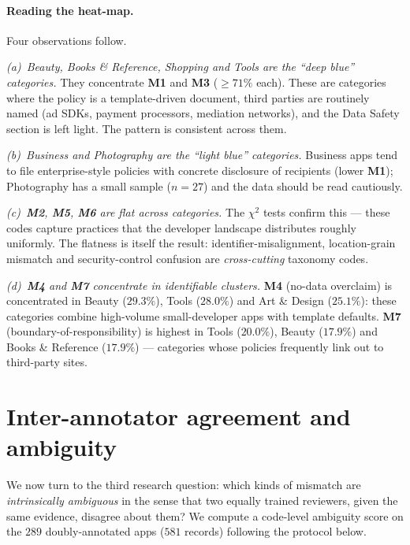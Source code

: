 \documentclass[11pt,a4paper]{article}
\newcommand{\code}[1]{\textsf{\textbf{#1}}}
\begin{document}
\paragraph{Reading the heat-map.} Four observations follow.

\emph{(a)~Beauty, Books \& Reference, Shopping and Tools are the
``deep blue'' categories.} They concentrate \code{M1} and \code{M3}
($\geq 71\%$ each). These are categories where the policy is a
template-driven document, third parties are routinely named (ad
SDKs, payment processors, mediation networks), and the Data Safety
section is left light. The pattern is consistent across them.

\emph{(b)~Business and Photography are the ``light blue'' categories.}
Business apps tend to file enterprise-style policies with concrete
disclosure of recipients (lower \code{M1}); Photography has a small
sample ($n=27$) and the data should be read cautiously.

\emph{(c)~\code{M2}, \code{M5}, \code{M6} are flat across categories.}
The $\chi^2$ tests confirm this --- these codes capture practices
that the developer landscape distributes roughly uniformly. The flatness
is itself the result: identifier-misalignment, location-grain mismatch
and security-control confusion are \emph{cross-cutting} taxonomy
codes.

\emph{(d)~\code{M4} and \code{M7} concentrate in identifiable
clusters.} \code{M4} (no-data overclaim) is concentrated in Beauty
($29.3\%$), Tools ($28.0\%$) and Art \& Design ($25.1\%$): these
categories combine high-volume small-developer apps with template
defaults. \code{M7} (boundary-of-responsibility) is highest in
Tools ($20.0\%$), Beauty ($17.9\%$) and Books \& Reference ($17.9\%$)
--- categories whose policies frequently link out to third-party
sites.

\section{Inter-annotator agreement and ambiguity}\label{sec:amb}

We now turn to the third research question: which kinds of mismatch
are \emph{intrinsically ambiguous} in the sense that two equally
trained reviewers, given the same evidence, disagree about them?
We compute a code-level ambiguity score on the $289$ doubly-annotated
apps ($581$ records) following the protocol below.
\end{document}

